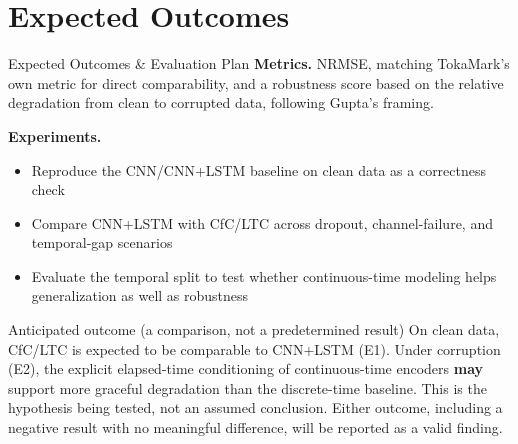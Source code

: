 \documentclass[aspectratio=169]{beamer}
\begin{document}
\section{Expected Outcomes}
\begin{frame}{Expected Outcomes \& Evaluation Plan}
  \small
  \textbf{Metrics.} NRMSE, matching TokaMark's own metric for direct
  comparability, and a robustness score based on the relative degradation
  from clean to corrupted data, following Gupta's framing.

  \vspace{4pt}
  \textbf{Experiments.}
  \begin{itemize}
    \item[E1] Reproduce the CNN/CNN+LSTM baseline on clean data as a
      correctness check
    \item[E2] Compare CNN+LSTM with CfC/LTC across dropout, channel-failure,
      and temporal-gap scenarios
    \item[E3] Evaluate the temporal split to test whether continuous-time
      modeling helps generalization as well as robustness
  \end{itemize}

  \vspace{4pt}
  \begin{block}{Anticipated outcome (a comparison, not a predetermined result)}
    On clean data, CfC/LTC is expected to be comparable to CNN+LSTM (E1).
    Under corruption (E2), the explicit elapsed-time conditioning of
    continuous-time encoders \textbf{may} support more graceful degradation
    than the discrete-time baseline. This is the hypothesis being tested, not
    an assumed conclusion. Either outcome, including a negative result with
    no meaningful difference, will be reported as a valid finding.
  \end{block}
\end{frame}

\end{document}
